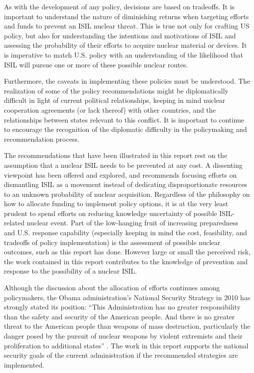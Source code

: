 \documentclass{report}
\begin{document}
As with the development of any policy, decisions are based on tradeoffs. It is important to understand the nature of diminishing returns when targeting efforts and funds to prevent an ISIL nuclear threat. This is true not only for crafting US policy, but also for understanding the intentions and motivations of ISIL and assessing the probability of their efforts to acquire nuclear material or devices. It is imperative to match U.S. policy with an understanding of the likelihood that ISIL will pursue one or more of these possible nuclear routes.

Furthermore, the caveats in implementing these policies must be understood. The realization of some of the policy recommendations might be diplomatically difficult in light of current political relationships, keeping in mind nuclear cooperation agreements (or lack thereof) with other countries, and the relationships between states relevant to this conflict. It is important to continue to encourage the recognition of the diplomatic difficulty in the policymaking and recommendation process.

The recommendations that have been illustrated in this report rest on the assumption that a nuclear ISIL needs to be prevented at any cost. A dissenting viewpoint has been offered and explored, and recommends focusing efforts on dismantling ISIL as a movement instead of dedicating disproportionate resources to an unknown probability of nuclear acquisition. Regardless of the philosophy on how to allocate funding to implement policy options, it is at the very least prudent to spend efforts on reducing knowledge uncertainty of possible ISIL-related nuclear event. Part of the low-hanging fruit of increasing preparedness and U.S. response capability (especially keeping in mind the cost, feasibility, and tradeoffs of policy implementation) is the assessment of possible nuclear outcomes, such as this report has done. However large or small the perceived risk, the work contained in this report contributes to the knowledge of prevention and response to the possibility of a nuclear ISIL.

Although the discussion about the allocation of efforts continues among policymakers, the Obama administration's National Security Strategy in 2010 has strongly stated its position: \enquote{This Administration has no greater responsibility than the safety and security of the American people. And there is no greater threat to the American people than weapons of mass destruction, particularly the danger posed by the pursuit of nuclear weapons by violent extremists and their proliferation to additional states} \cite{Obama2010}. The work in this report supports the national security goals of the current administration if the recommended strategies are implemented.
\end{document}
